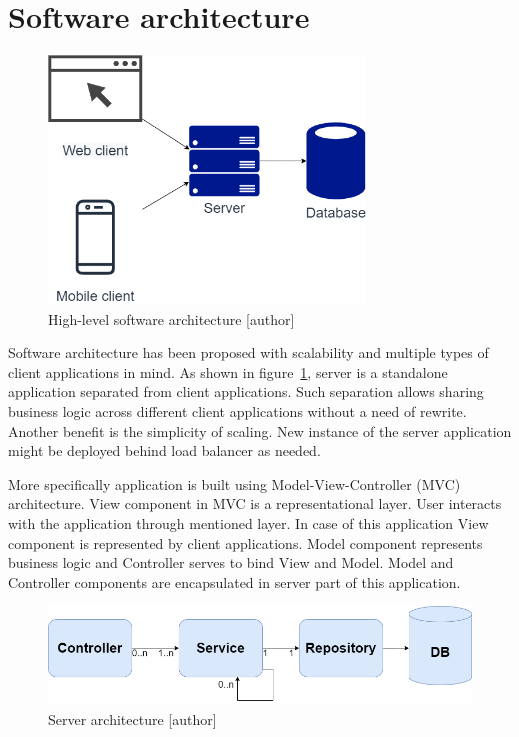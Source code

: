 
\section{Software architecture}\label{sec:software-architecture}

\begin{figure}[h!]
    \includegraphics[width=0.75\textwidth]{images/high-level-architecture}
    \caption{High-level software architecture [author]}
    \label{fig:high-level-architecture}
\end{figure}

Software architecture has been proposed with scalability and multiple types of client applications in mind.
As shown in figure~\ref{fig:high-level-architecture}, server is a standalone application separated from client applications.
Such separation allows sharing business logic across different client applications without a need of rewrite.
Another benefit is the simplicity of scaling.
New instance of the server application might be deployed behind load balancer as needed.

More specifically application is built using Model-View-Controller (MVC) architecture.\cite{wiki-mvc}
View component in MVC is a representational layer.
User interacts with the application through mentioned layer.
In case of this application View component is represented by client applications.
Model component represents business logic and Controller serves to bind View and Model.
Model and Controller components are encapsulated in server part of this application.

\begin{figure}[h!]
    \includegraphics[width=1\textwidth]{images/server-mvc-spring}
    \caption{Server architecture [author]}
    \label{fig:server-mvc-spring}
\end{figure}

